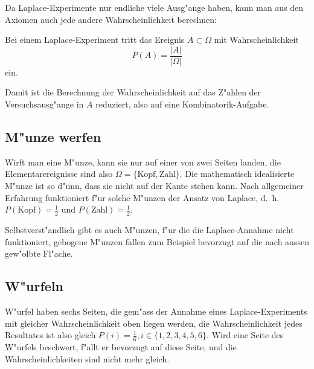 Da Laplace-Experimente nur endliche viele Ausg"ange haben, kann man aus
den Axiomen auch jede andere Wahrscheinlichkeit berechnen:

\begin{satz}
Bei einem Laplace-Experiment tritt das Ereignis $A\subset\Omega$ mit
Wahrscheinlichkeit
\[
P(A)=\frac{|A|}{|\Omega|}
\]
ein.
\end{satz}
Damit ist die Berechnung der Wahrscheinlichkeit auf das Z"ahlen der 
Versuchsausg"ange in $A$ reduziert, also auf eine Kombinatorik-Aufgabe.

\subsection{M"unze werfen}
Wirft man eine M"unze, kann sie nur auf einer von zwei Seiten landen,
die Elementarereignisse sind also $\Omega = \{\text{Kopf}, \text{Zahl}\}$.
Die mathematisch idealisierte M"unze ist so d"unn, dass sie nicht auf
der Kante stehen kann.
Nach allgemeiner Erfahrung funktioniert f"ur
solche M"unzen der Ansatz von Laplace, d.~h.~$P(\text{Kopf}) = \frac12$
und $P(\text{Zahl})=\frac12$.

Selbstverst"andlich gibt es auch M"unzen, f"ur die die Laplace-Annahme
nicht funktioniert, gebogene M"unzen fallen zum Beispiel bevorzugt auf die
nach aussen gew"olbte Fl"ache.

\subsection{W"urfeln}
W"urfel haben sechs Seiten, die gem"ass der Annahme eines Laplace-Experiments
mit gleicher
Wahrscheinlichkeit oben liegen werden, die Wahrscheinlichkeit jedes
Resultates ist also gleich $P(i) = \frac16, i\in\{1,2,3,4,5,6\}$.
Wird eine Seite des W"urfels beschwert, f"allt er bevorzugt auf diese
Seite, und die Wahrscheinlichkeiten sind nicht mehr gleich.

